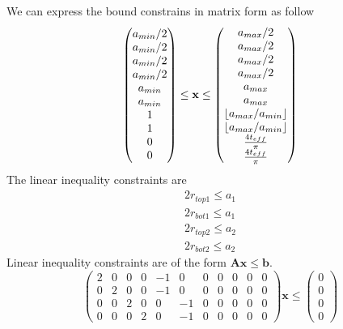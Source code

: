 \documentclass[12pt]{article}
\numberwithin{equation}{section}
\DeclarePairedDelimiter\floor{\lfloor}{\rfloor}
\numberwithin{equation}{section}
\begin{document}
\begin{outline}[enumerate]
We can express the bound constrains in matrix form as follow
\begin{equation}
\left(
\begin{matrix}
a_{min}/2\\ 
a_{min}/2\\ 
a_{min}/2\\ 
a_{min}/2\\
a_{min}\\ 
a_{min}\\ 
1 \\    %
1 \\
0 \\
0 
\end{matrix} \right )
\leq \mathbf{x}
 \leq 
 \left(
\begin{matrix}
a_{max}/2 \\ a_{max}/2 \\ a_{max}/2 \\ a_{max}/2 \\ a_{max} \\ a_{max} \\  \floor{a_{max}/a_{min}} \\  \floor{a_{max}/a_{min}} \\ \frac{4 t_{eff}}{\pi}  \\\frac{4 t_{eff}}{\pi} 
\end{matrix} \right )
\end{equation}
The linear inequality constraints are 
\begin{align*} 
2r_{top1} \leq a_1 \\
2r_{bot1} \leq a_1\\
2r_{top2} \leq a_2\\
2r_{bot2} \leq a_2 
\end{align*}
Linear inequality constraints are of the form $\mathbf{A} \mathbf{x} \leq \mathbf{b}$.
\setcounter{MaxMatrixCols}{20}
\begin{equation}
\left(
\begin{matrix}
2 & 0 & 0 & 0 & -1 & 0 & 0 & 0 & 0 & 0 & 0 \\
0 & 2 & 0 & 0 & -1 & 0 & 0 & 0 & 0 & 0 & 0\\
0 & 0 & 2 & 0 & 0 & -1 & 0 & 0 & 0 & 0 & 0\\
0 & 0 & 0 & 2 & 0 & -1 & 0 & 0 & 0 & 0 & 0
\end{matrix}
\right ) \mathbf{x}  \leq \left ( \begin{matrix} 0\\ 0\\ 0\\ 0 \end{matrix} \right ) 

\end{equation}
\end{outline}
\end{document}

